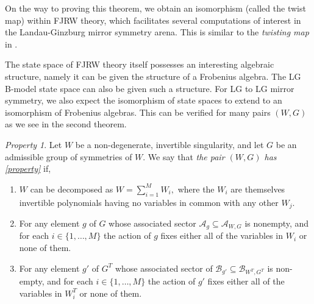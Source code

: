 \documentclass[10pt, letterpaper]{amsart}
\theoremstyle{remark}
\providecommand*{\propertyautorefname}{Property}
\newtheorem{property}{\propertyautorefname}
\newcommand{\sA}{\mathscr{A}}
\newcommand{\sB}{\mathscr{B}}
\newcommand{\amanda}[1]{\todo[color=red(munsell),fancyline]{Am:#1}}
\newcommand{\nathan}[1]{\todo[color=pistachio,fancyline]{N:#1}}
\begin{document}
On the way to proving this theorem, we obtain an isomorphism (called the twist map) within FJRW theory, which facilitates several computations of interest in the Landau-Ginzburg mirror symmetry arena. This is similar to the \textit{twisting map} in \cite{GLY}.  %

The state space of FJRW theory itself possesses an interesting algebraic structure, namely it can be given the structure of a Frobenius algebra. The LG B-model state space can also be given such a structure. For LG to LG mirror symmetry, we also expect the isomorphism of state spaces to extend to an isomorphism of Frobenius algebras. This can be verified for many pairs $(W,G)$ as we see in the second theorem. 

\begin{property}\label{property}
Let $W$ be a non-degenerate, invertible singularity, and let $G$ be an admissible group of symmetries of $W$. We say that \emph{the pair $(W,G)$ has \autoref{property}} if, 
\begin{enumerate}
\item $W$ can be decomposed as
 $   W = \sum_{i=1}^{M} W_i ,$
where the $W_i$ are themselves invertible polynomials having no variables in common with any other $W_j$.  
\item For any element $g$ of $G$ whose associated sector  $\sA_g \subseteq \sA_{W,G}$ is nonempty, and for each $i\in \{1,\dots ,M\}$ the action of $g$ fixes either all of the variables in $W_i$ or none of them. 
\item For any element $g'$ of $G^T$ whose associated sector of $\sB_{g'} \subseteq \sB_{W^T,G^T}$ is non-empty, and for each $i\in \{1,\dots ,M\}$ the action of $g'$ fixes either all of the variables in $W_i^T$ or none of them.
\end{enumerate}
\end{property}
\end{document}
